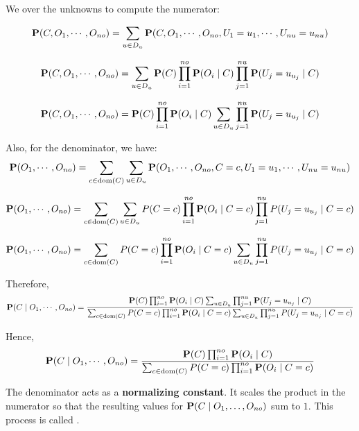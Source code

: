 We  over the unknowns to compute the numerator:

\[
\textbf{P}(C,O_1, \cdots, O_{no}) = \sum_{u \in D_u} \textbf{P}(C,O_1,\cdots, O_{no},U_1=u_1,\cdots, U_{nu}=u_{nu})
\]

\[
\textbf{P}(C,O_1, \cdots, O_{no}) = \sum_{u \in D_u} \textbf{P}(C) \prod_{i=1}^{no} \textbf{P}(O_i \mid C) \prod_{j=1}^{nu} \textbf{P}(U_j=u_{u_j} \mid C)
\]


\[
\textbf{P}(C,O_1, \cdots, O_{no}) = \textbf{P}(C) \prod_{i=1}^{no} \textbf{P}(O_i \mid C) \sum_{u \in D_u} \prod_{j=1}^{nu}  \textbf{P}(U_j=u_{u_j} \mid C)
\]

Also, for the denominator, we have: 
\[
\textbf{P}(O_1, \cdots, O_{no}) = \sum_{c \in \text{dom}(C)} \sum_{u \in D_u} \textbf{P}(O_1,\cdots, O_{no}, C=c, U_1 = u_1, \cdots, U_{nu}=u_{nu})
\]

\[
\textbf{P}(O_1, \cdots, O_{no}) = \sum_{c \in \text{dom}(C)} \sum_{u \in D_u} P(C=c) \prod_{i=1}^{no}\textbf{P}(O_i \mid C=c) \prod_{j=1}^{nu} P(U_j=u_{u_j} \mid C=c)
\]

\[
\textbf{P}(O_1, \cdots, O_{no}) = \sum_{c \in \text{dom}(C)} P(C=c) \prod_{i=1}^{no}\textbf{P}(O_i \mid C=c) \sum_{u \in D_u} \prod_{j=1}^{nu} P(U_j=u_{u_j} \mid C=c)
\]

Therefore, 
\[
\textbf{P}(C \mid O_1, \cdots, O_{no}) =
\frac{\textbf{P}(C) \prod_{i=1}^{no} \textbf{P}(O_i \mid C) \sum_{u \in D_u} \prod_{j=1}^{nu}  \textbf{P}(U_j=u_{u_j} \mid C)}
{\sum_{c \in \text{dom}(C)} P(C=c) \prod_{i=1}^{no}\textbf{P}(O_i \mid C=c) \sum_{u \in D_u} \prod_{j=1}^{nu} P(U_j=u_{u_j} \mid C=c)}
\]


Hence,
\[
\textbf{P}(C \mid O_1, \cdots, O_{no}) =
\frac{\textbf{P}(C) \prod_{i=1}^{no} \textbf{P}(O_i \mid C)}
{\sum_{c \in \text{dom}(C)} P(C=c) \prod_{i=1}^{no}\textbf{P}(O_i \mid C=c)}
\]


\begin{tcolorbox}[colback=red!5!white,colframe=red!75!black]
The denominator acts as a \textbf{normalizing constant}. It scales the product in the numerator so that the resulting values for $\textbf{P}(C \mid O_1, \dots, O_{no})$ sum to $1$. This process is called .
\end{tcolorbox}

